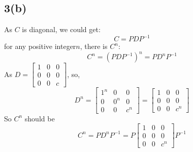 \documentclass{article}
\begin{document}
\subsection*{3(b)}
As $C$ is diagonal, we could get:
$$
C = PDP^{-1}
$$
for any positive integer$n$, there is $C^{n}$:
$$
C^{n} = (PDP^{-1})^{n} = PD^{n}P^{-1}
$$
As $D = \begin{bmatrix}
    1 & 0 & 0 \\
    0 & 0 & 0 \\
    0 & 0 & c
\end{bmatrix}$,
so,
$$
D^{n} = 
\begin{bmatrix}
    1^{n} & 0 & 0 \\
    0 & 0^{n} & 0 \\
    0 & 0 & c^{n}
\end{bmatrix}
=
\begin{bmatrix}
    1 & 0 & 0 \\
    0 & 0 & 0 \\
    0 & 0 & c^{n}
\end{bmatrix}
$$
So $C^{n}$ should be
$$
C^{n}
= PD^{n}P^{-1}
= 
P
\begin{bmatrix}
    1 & 0 & 0 \\
    0 & 0 & 0 \\
    0 & 0 & c^{n}
\end{bmatrix}
P^{-1}
$$
\end{document}
